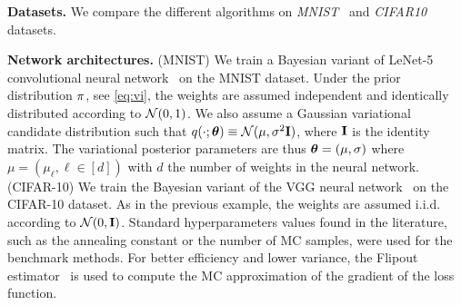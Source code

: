\documentclass[tablecaption=bottom,wcp]{jmlr}
\begin{document}
\vspace{0.08in}
\noindent \textbf{Datasets.}\hspace{0.1in}
We compare the different algorithms on \textit{MNIST}~\citep{lecun1998mnist} and \textit{CIFAR10}~\citep{krizhevsky2009learning} datasets.

\vspace{0.08in}
\noindent \textbf{Network architectures.} \hspace{0.1in}
(MNIST) We train a Bayesian variant of LeNet-5 convolutional neural network~\citep{lecun1998gradient} on the MNIST dataset. 
Under the prior distribution $\prior$, see \eqref{eq:vi}, the weights are assumed independent and identically distributed according to ${\cal N}(0,1)$.
We also assume a Gaussian variational candidate distribution such that $q(\cdot; \param) \equiv  \mathcal{N}(\mu,\sigma^2 \Id )$, where $\Id$ is the identity matrix.
The variational posterior parameters are thus $\param = (\mu, \sigma) $ where $\mu = (\mu_\ell, \ell \in [d])$ with $d$ the number of weights in the neural network. 
(CIFAR-10) We train the Bayesian variant of the VGG neural network~\citep{simonyan2014very} on the CIFAR-10 dataset.
As in the previous example, the weights are assumed i.i.d. according to ${\cal N}(0,\Id)$.
Standard hyperparameters values found in the literature, such as the annealing constant or the number of MC samples, were used for the benchmark methods. 
For better efficiency and lower variance, the Flipout estimator~\citep{wen2018flipout} is used to compute the MC approximation of the gradient of the loss function.
\end{document}
